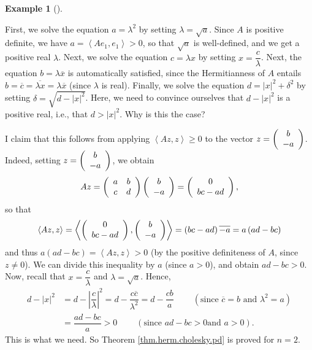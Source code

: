 \documentclass[numbers=enddot,12pt,final,onecolumn,notitlepage]{scrartcl}%
\numberwithin{exer}{subsection}
\theoremstyle{definition}
\newtheorem{exam}[theo]{Example}
\newenvironment{example}[1][]
{\begin{exam}[#1]\begin{leftbar}}
{\end{leftbar}\end{exam}}
\begin{document}
\begin{example}
First, we solve the equation $a=\lambda^{2}$ by setting $\lambda=\sqrt{a}$.
Since $A$ is positive definite, we have $a=\left\langle Ae_{1},e_{1}%
\right\rangle >0$, so that $\sqrt{a}$ is well-defined, and we get a positive
real $\lambda$. Next, we solve the equation $c=\lambda x$ by setting
$x=\dfrac{c}{\lambda}$. Next, the equation $b=\lambda\overline{x}$ is
automatically satisfied, since the Hermitianness of $A$ entails $b=\overline
{c}=\overline{\lambda x}=\lambda\overline{x}$ (since $\lambda$ is real).
Finally, we solve the equation $d=\left\vert x\right\vert ^{2}+\delta^{2}$ by
setting $\delta=\sqrt{d-\left\vert x\right\vert ^{2}}$. Here, we need to
convince ourselves that $d-\left\vert x\right\vert ^{2}$ is a positive real,
i.e., that $d>\left\vert x\right\vert ^{2}$. Why is this the case?

I claim that this follows from applying $\left\langle Az,z\right\rangle \geq0$
to the vector $z=\left(
\begin{array}
[c]{c}%
b\\
-a
\end{array}
\right)  $. Indeed, setting $z=\left(
\begin{array}
[c]{c}%
b\\
-a
\end{array}
\right)  $, we obtain%
\[
Az=\left(
\begin{array}
[c]{cc}%
a & b\\
c & d
\end{array}
\right)  \left(
\begin{array}
[c]{c}%
b\\
-a
\end{array}
\right)  =\left(
\begin{array}
[c]{c}%
0\\
bc-ad
\end{array}
\right)  ,
\]
so that%
\[
\left\langle Az,z\right\rangle =\left\langle \left(
\begin{array}
[c]{c}%
0\\
bc-ad
\end{array}
\right)  ,\left(
\begin{array}
[c]{c}%
b\\
-a
\end{array}
\right)  \right\rangle =\left(  bc-ad\right)  \overline{-a}=a\left(
ad-bc\right)
\]
and thus $a\left(  ad-bc\right)  =\left\langle Az,z\right\rangle >0$ (by the
positive definiteness of $A$, since $z\neq0$). We can divide this inequality
by $a$ (since $a>0$), and obtain $ad-bc>0$. Now, recall that $x=\dfrac
{c}{\lambda}$ and $\lambda=\sqrt{a}$. Hence,%
\begin{align*}
d-\left\vert x\right\vert ^{2}  &  =d-\left\vert \dfrac{c}{\lambda}\right\vert
^{2}=d-\dfrac{c\overline{c}}{\lambda^{2}}=d-\dfrac{cb}{a}%
\ \ \ \ \ \ \ \ \ \ \left(  \text{since }\overline{c}=b\text{ and }\lambda
^{2}=a\right) \\
&  =\dfrac{ad-bc}{a}>0\ \ \ \ \ \ \ \ \ \ \left(  \text{since }ad-bc>0\text{
and }a>0\right)  .
\end{align*}
This is what we need. So Theorem \ref{thm.herm.cholesky.pd} is proved for
$n=2$.
\end{example}
\end{document}
